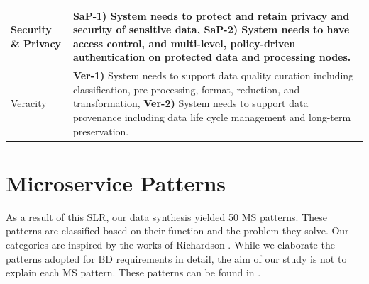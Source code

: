 \documentclass[a4paper,11pt,article,oneside]{memoir}
\begin{document}
\begin{table}[h]
\begin{tabular}{|m{1.2cm}|m{14cm}|}
        \hline

        Security \& Privacy & 
        
        \textbf{SaP-1)} System needs to protect and retain privacy and security of sensitive data, \textbf{SaP-2)} System needs to have access control, and multi-level, policy-driven authentication on protected data and processing nodes. 
        \\

        \hline
        
        Veracity &
        
        \textbf{Ver-1)} System needs to support data quality curation including classification, pre-processing, format, reduction, and  transformation, \textbf{Ver-2)} System needs to support data provenance including data life cycle management and long-term preservation.
        \\
        \hline
  
    \end{tabular}
    \label{table-requirements}
    \end{table}


\section{Microservice Patterns}

As a result of this SLR, our data synthesis yielded 50 MS patterns. These patterns are classified based on their function and the problem they solve. Our categories are inspired by the works of Richardson \cite{Richardson.2022}. While we elaborate the patterns adopted for BD requirements in detail, the aim of our study is not to explain each MS pattern. These patterns can be found in \cite{MSPatterns}.
  


 


 
\end{document}
